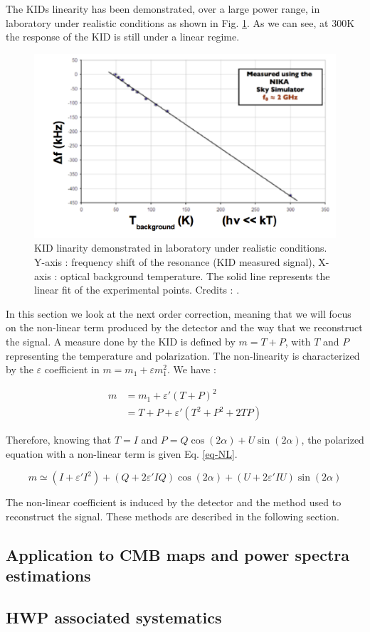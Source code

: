The KIDs linearity has been demonstrated, over a large power range, in laboratory under realistic conditions as shown in Fig. \ref{KID-lin}. As we can see, at 300K the response of the KID is still under a linear regime.

\begin{figure}[h]
\center
	\includegraphics[scale=0.4]{KID-linearity-Monfardini2014.png}
	\caption{KID linarity demonstrated in laboratory under realistic conditions. Y-axis : frequency shift of the resonance (KID measured signal), X-axis : optical background temperature. The solid line represents the linear fit of the experimental points. Credits : \citet{2014JLTP..176..787M}.}
	\label{KID-lin}
\end{figure}

In this section we look at the next order correction, meaning that we will focus on the non-linear term produced by the detector and the way that we reconstruct the signal. A measure done by the KID is defined by $m = T + P$, with $T$ and $P$ representing the temperature and polarization. The non-linearity is characterized  by the $\varepsilon$ coefficient in $ m = m_{1} + \varepsilon m_{1}^{2}$. We have : 

\begin{equation}
\begin{split}
m & = m_{1} +\varepsilon' (T+P)^{2} \\
 & = T + P + \varepsilon'(T^{2} + P^{2} + 2TP) 
\end{split}
\end{equation}

Therefore, knowing that $T=I$ and $P = Q\cos(2\alpha) + U \sin(2\alpha)$, the polarized equation with a non-linear term is given Eq. \ref{eq-NL}.

\begin{equation}
m  \simeq (I + \varepsilon' I^{2}) + (Q + 2\varepsilon' IQ) \cos(2\alpha) + (U + 2 \varepsilon' IU) \sin(2\alpha)
\label{eq-NL}
\end{equation}

The non-linear coefficient is induced by the detector and the method used to reconstruct the signal. These methods are described in the following section.



\subsection{Application to CMB maps and power spectra estimations}
\subsection{HWP associated systematics}
